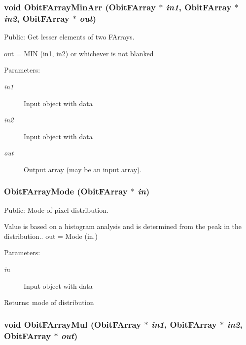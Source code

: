 \subsubsection{\setlength{\rightskip}{0pt plus 5cm}void Obit\-FArray\-Min\-Arr ({\bf Obit\-FArray} $\ast$ {\em in1}, {\bf Obit\-FArray} $\ast$ {\em in2}, {\bf Obit\-FArray} $\ast$ {\em out})}\label{ObitFArray_8c_a49}


Public: Get lesser elements of two FArrays. 

out = MIN (in1, in2) or whichever is not blanked \begin{Desc}
\item[Parameters:]
\begin{description}
\item[{\em in1}]Input object with data \item[{\em in2}]Input object with data \item[{\em out}]Output array (may be an input array). \end{description}
\end{Desc}
\subsubsection{ Obit\-FArray\-Mode ({\bf Obit\-FArray} $\ast$ {\em in})}\label{ObitFArray_8c_a33}


Public: Mode of pixel distribution. 

Value is based on a histogram analysis and is determined from the peak in the distribution.. out = Mode (in.) \begin{Desc}
\item[Parameters:]
\begin{description}
\item[{\em in}]Input object with data \end{description}
\end{Desc}
\begin{Desc}
\item[Returns:]mode of distribution \end{Desc}
\subsubsection{\setlength{\rightskip}{0pt plus 5cm}void Obit\-FArray\-Mul ({\bf Obit\-FArray} $\ast$ {\em in1}, {\bf Obit\-FArray} $\ast$ {\em in2}, {\bf Obit\-FArray} $\ast$ {\em out})}\label{ObitFArray_8c_a54}


